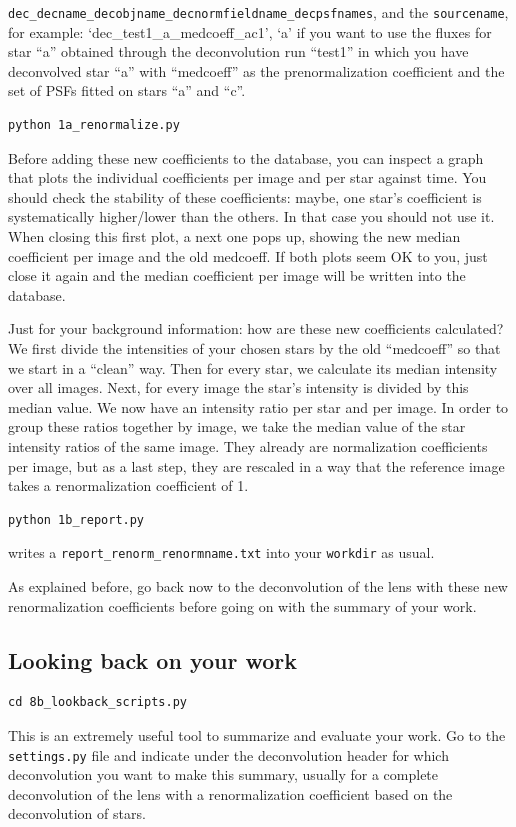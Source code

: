\verb+dec_decname_decobjname_decnormfieldname_decpsfnames+, and the \verb+sourcename+, for example: `dec\_test1\_a\_medcoeff\_ac1', `a' if you want to use the fluxes for star ``a'' obtained through the deconvolution run ``test1'' in which you have deconvolved star ``a'' with ``medcoeff'' as the prenormalization coefficient and the set of PSFs fitted on stars ``a'' and ``c''.

\begin{Verbatim}
python 1a_renormalize.py
\end{Verbatim}
Before adding these new coefficients to the database, you can inspect a graph that plots the individual coefficients per image and per star against time. You should check the stability of these coefficients: maybe, one star's coefficient is systematically higher/lower than the others. In that case you should not use it. When closing this first plot, a next one pops up, showing the new median coefficient per image and the old medcoeff. If both plots seem OK to you, just close it again and the median coefficient per image will be written into the database. 

Just for your background information: how are these new coefficients calculated?
We first divide the intensities of your chosen stars by the old ``medcoeff'' so that we start in a ``clean'' way. Then for every star, we calculate its median intensity over all images. Next, for every image the star's intensity is divided by this median value. We now have an intensity ratio per star and per image. In order to group these ratios together by image, we take the median value of the star intensity ratios of the same image. They already are normalization coefficients per image, but as a last step, they are rescaled in a way that the reference image takes a renormalization coefficient of 1.

\begin{Verbatim}
python 1b_report.py
\end{Verbatim}
writes a \verb+report_renorm_renormname.txt+ into your \verb+workdir+ as usual.

As explained before, go back now to the deconvolution of the lens with these new renormalization coefficients before going on with the summary of your work.

\subsection{Looking back on your work}

\begin{Verbatim}
cd 8b_lookback_scripts.py
\end{Verbatim}
This is an extremely useful tool to summarize and evaluate your work. Go to the \verb+settings.py+ file and indicate under the deconvolution header for which deconvolution you want to make this summary, usually for a complete deconvolution of the lens with a renormalization coefficient based on the deconvolution of stars. 

